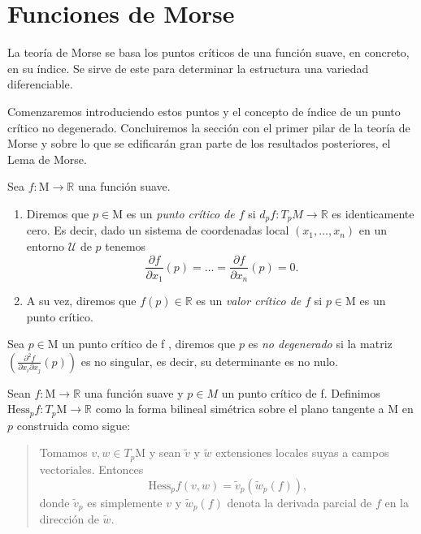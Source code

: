 
\section{Funciones de Morse}

La teoría de Morse se basa los puntos críticos de una función suave, en concreto, en su índice. Se sirve de este para determinar la estructura una variedad diferenciable. 

Comenzaremos introduciendo estos puntos y el concepto de índice de un punto crítico no degenerado. Concluiremos la sección con el primer pilar de la teoría de Morse y sobre lo que se edificarán gran parte de los resultados posteriores, el Lema de Morse.

\begin{definition}
    Sea $f: \mathrm{M} \to \mathbb{R}$ una función suave.
    \begin{enumerate}[label=\roman*)]
        \item Diremos que $p\in \mathrm{M}$ es un \textit{punto crítico de $f$} si $d_{p}f:T_{p}M\to \mathbb{R}$ es identicamente cero. Es decir, dado un sistema de coordenadas local $(x_{1}, \dots ,x_{n})$ en un entorno $\mathcal{U}$ de $p$ tenemos
        \begin{equation*}
            \frac{\partial f}{\partial x_1}(p)= \dots = \frac{\partial f}{\partial x_n}(p) = 0.
        \end{equation*}
        
        \item A su vez, diremos que $f(p)\in \mathbb{R}$ es un \textit{valor crítico de $f$} si $p \in \mathrm{M}$ es un punto crítico.
        
    \end{enumerate}
\end{definition}
\bigskip

\begin{definition}
    Sea $p\in \mathrm{M}$ un punto crítico de f , diremos que $p$ es \textit{no degenerado} si la matriz  $\left(\frac{\partial^{2}f}{\partial x_i \partial x_j}(p)\right)$ es no singular, es decir, su determinante es no nulo.
\end{definition}
\bigskip

\begin{definition}
    Sean $f:\mathrm{M}\to \mathbb{R}$ una función suave y $p\in M$ un punto crítico de f. Definimos $\textrm{Hess}_{p}f: T_{p}\mathrm{M}\to \mathbb{R}$ como la forma bilineal simétrica sobre el plano tangente a $\mathrm{M}$ en $p$ construida como sigue:
    \begin{quote}
        Tomamos $v,w\in T_{p}\mathrm{M}$ y sean $\tilde{v}$ y $\tilde{w}$ extensiones locales suyas a campos vectoriales. Entonces 
        \begin{equation*}
            \text{Hess}_{p}f(v,w)=\tilde{v}_{p}(\tilde{w}_{p}(f)),
        \end{equation*}
        donde $\tilde{v}_{p}$ es simplemente $v$ y $\tilde{w}_{p}(f)$ denota la derivada parcial de $f$ en la dirección de $\tilde{w}$.
    \end{quote}
\end{definition}
\bigskip


